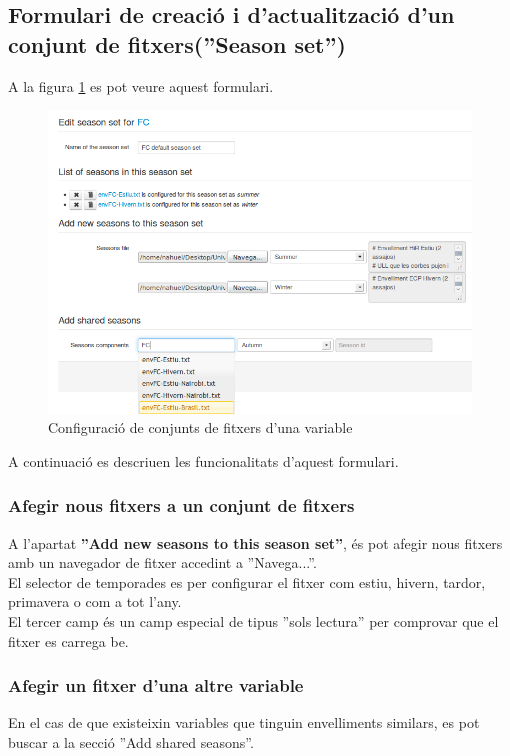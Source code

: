 \subsection{Formulari de creació i d'actualització d'un conjunt de fitxers(''Season set'')}
A la figura \ref{fig:seasonSetEdition} es pot veure aquest formulari.
\label{season_set:variable}
\begin{figure}[h!]
  \centering
  \includegraphics[scale=0.5]{img/userguide/season_set_edition.png}
  \caption{Configuraci\'{o} de conjunts de fitxers d'una variable}
  \label{fig:seasonSetEdition}
\end{figure}
A continuació es descriuen les funcionalitats d'aquest formulari.

\subsubsection{Afegir nous fitxers a un conjunt de fitxers}
A l'apartat \textbf{''Add new seasons to this season set''}, \'{e}s pot afegir nous fitxers amb un navegador de fitxer accedint a ''Navega...''. \\

El selector de temporades es per configurar el fitxer com estiu, hivern, tardor, primavera o com a tot l'any.\\

El tercer camp \'{e}s un camp especial de tipus ''sols lectura'' per comprovar que el fitxer es carrega be.

\subsubsection{Afegir un fitxer d'una altre variable}
En el cas de que existeixin variables que tinguin envelliments similars, es pot buscar a la secció ''Add shared seasons''.\\

